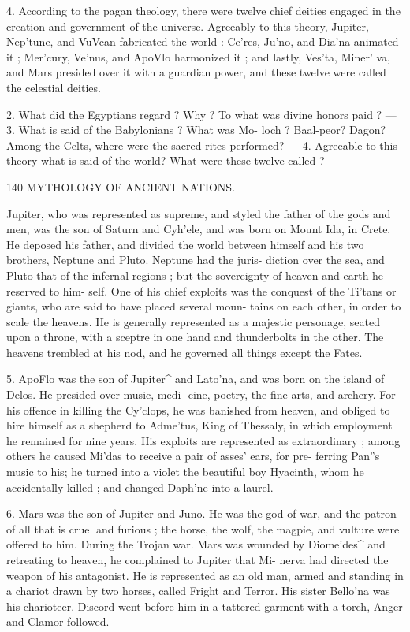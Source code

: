 \documentclass[openany,a4paper]{memoir}
\begin{document}
4. According to the pagan theology, there were twelve 
chief deities engaged in the creation and government of the 
universe. Agreeably to this theory, Jupiter, Nep'tune, and 
VuVcan fabricated the world : Ce'res, Ju'no, and Dia'na 
animated it ; Mer'cury, Ve'nus, and ApoVlo harmonized it ; 
and lastly, Ves'ta, Miner' va, and Mars presided over it with 
a guardian power, and these twelve were called the celestial 
deities. 

2. What did the Egyptians regard ? Why ? To what was divine 
honors paid ? — 3. What is said of the Babylonians ? What was Mo- 
loch ? Baal-peor? Dagon? Among the Celts, where were the sacred 
rites performed? — 4. Agreeable to this theory what is said of the world? 
What were these twelve called ? 



140 MYTHOLOGY OF ANCIENT NATIONS. 

Jupiter, who was represented as supreme, and styled the 
father of the gods and men, was the son of Saturn and 
Cyh'ele, and was born on Mount Ida, in Crete. He deposed 
his father, and divided the world between himself and his 
two brothers, Neptune and Pluto. Neptune had the juris- 
diction over the sea, and Pluto that of the infernal regions ; 
but the sovereignty of heaven and earth he reserved to him- 
self. One of his chief exploits was the conquest of the 
Ti'tans or giants, who are said to have placed several moun- 
tains on each other, in order to scale the heavens. He is 
generally represented as a majestic personage, seated upon 
a throne, with a sceptre in one hand and thunderbolts in the 
other. The heavens trembled at his nod, and he governed all 
things except the Fates. 

5. ApoFlo was the son of Jupiter^ and Lato'na, and was 
born on the island of Delos. He presided over music, medi- 
cine, poetry, the fine arts, and archery. For his offence in 
killing the Cy'clops, he was banished from heaven, and 
obliged to hire himself as a shepherd to Adme'tus, King of 
Thessaly, in which employment he remained for nine years. 
His exploits are represented as extraordinary ; among others 
he caused Mi'das to receive a pair of asses' ears, for pre- 
ferring Pan''s music to his; he turned into a violet the 
beautiful boy Hyacinth, whom he accidentally killed ; and 
changed Daph'ne into a laurel. 

6. Mars was the son of Jupiter and Juno. He was the god 
of war, and the patron of all that is cruel and furious ; the 
horse, the wolf, the magpie, and vulture were offered to him. 
During the Trojan war. Mars was wounded by Diome'des^ 
and retreating to heaven, he complained to Jupiter that Mi- 
nerva had directed the weapon of his antagonist. He is 
represented as an old man, armed and standing in a chariot 
drawn by two horses, called Fright and Terror. His sister 
Bello'na was his charioteer. Discord went before him in a 
tattered garment with a torch, Anger and Clamor followed. 
\end{document}
